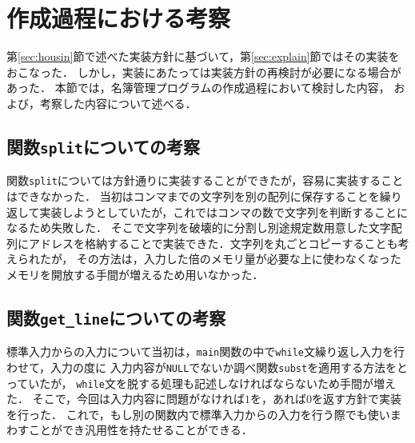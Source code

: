 \documentclass[a4j,11pt]{jarticle}
\begin{document}
\section{作成過程における考察}


第\ref{sec:housin}節で述べた実装方針に基づいて，第\ref{sec:explain}節ではその実装をおこなった．
しかし，実装にあたっては実装方針の再検討が必要になる場合があった．
本節では，名簿管理プログラムの作成過程において検討した内容，
および，考察した内容について述べる．

\subsection{関数\texttt{split}についての考察}

関数\verb|split|については方針通りに実装することができたが，容易に実装することはできなかった．
当初はコンマまでの文字列を別の配列に保存することを繰り返して実装しようとしていたが，これではコンマの数で文字列を判断することになるため失敗した．
そこで文字列を破壊的に分割し別途規定数用意した文字配列にアドレスを格納することで実装できた．文字列を丸ごとコピーすることも考えられたが，
その方法は，入力した倍のメモリ量が必要な上に使わなくなったメモリを開放する手間が増えるため用いなかった．

\subsection{関数\texttt{get\_line}についての考察}
標準入力からの入力について当初は，\verb|main|関数の中で\verb|while|文繰り返し入力を行わせて，入力の度に
入力内容が\verb|NULL|でないか調べ関数\verb|subst|を適用する方法をとっていたが，
\verb|while|文を脱する処理も記述しなければならないため手間が増えた．
そこで，今回は入力内容に問題がなければ$1$を，あれば$0$を返す方針で実装を行った．
これで，もし別の関数内で標準入力からの入力を行う際でも使いまわすことができ汎用性を持たせることができる．
\end{document}
